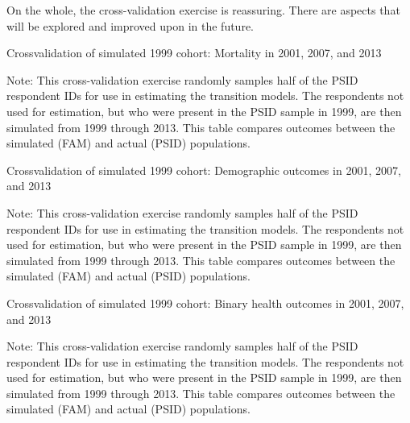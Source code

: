 \noindent On the whole, the cross-validation exercise is reassuring. There are aspects that will be explored and improved upon in the future.\\

\begin{table}[H]
\begin{threeparttable}
\caption{Crossvalidation of simulated 1999 cohort: Mortality in 2001, 2007, and 2013}
\label{table:crossval_unweighted}
\centering
\footnotesize

\begin{tablenotes}
\footnotesize
\item Note: This cross-validation exercise randomly samples half of the PSID respondent IDs for use in estimating the transition models. The respondents not used for estimation, but who were present in the PSID sample in 1999, are then simulated from 1999 through 2013. This table compares outcomes between the simulated (FAM) and actual (PSID) populations.
\end{tablenotes}
\end{threeparttable}
\end{table}

\begin{table}[H]
\begin{threeparttable}
\caption{Crossvalidation of simulated 1999 cohort: Demographic outcomes in 2001, 2007, and 2013}
\label{table:crossval_demog}
\centering
\footnotesize

\begin{tablenotes}
\footnotesize
\item Note: This cross-validation exercise randomly samples half of the PSID respondent IDs for use in estimating the transition models. The respondents not used for estimation, but who were present in the PSID sample in 1999, are then simulated from 1999 through 2013. This table compares outcomes between the simulated (FAM) and actual (PSID) populations.
\end{tablenotes}
\end{threeparttable}
\end{table}

\begin{table}[H]
\begin{threeparttable}
\caption{Crossvalidation of simulated 1999 cohort: Binary health outcomes in 2001, 2007, and 2013}
\label{table:crossval_binhlth}
\centering
\footnotesize

\begin{tablenotes}
\footnotesize
\item Note: This cross-validation exercise randomly samples half of the PSID respondent IDs for use in estimating the transition models. The respondents not used for estimation, but who were present in the PSID sample in 1999, are then simulated from 1999 through 2013. This table compares outcomes between the simulated (FAM) and actual (PSID) populations.
\end{tablenotes}
\end{threeparttable}
\end{table}

